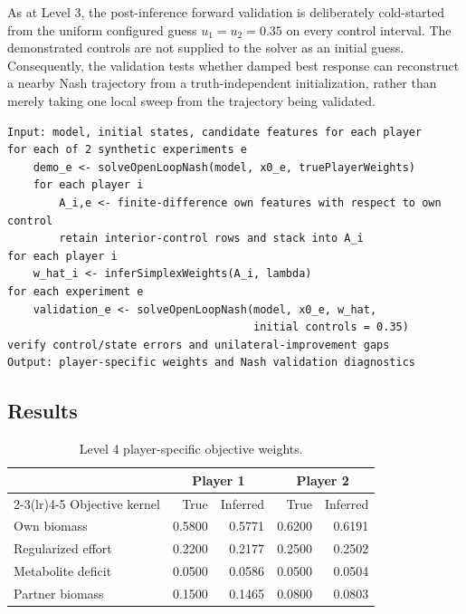 \documentclass[11pt,a4paper]{article}
\begin{document}
As at Level 3, the post-inference forward validation is deliberately
cold-started from the uniform configured guess \(u_1=u_2=0.35\) on every
control interval. The demonstrated controls are not supplied to the solver as
an initial guess. Consequently, the validation tests whether damped best
response can reconstruct a nearby Nash trajectory from a truth-independent
initialization, rather than merely taking one local sweep from the trajectory
being validated.

\noindent\begin{minipage}{\linewidth}
\begin{lstlisting}[style=pseudostyle,title={Compact MATLAB pseudocode}]
Input: model, initial states, candidate features for each player
for each of 2 synthetic experiments e
    demo_e <- solveOpenLoopNash(model, x0_e, truePlayerWeights)
    for each player i
        A_i,e <- finite-difference own features with respect to own control
        retain interior-control rows and stack into A_i
for each player i
    w_hat_i <- inferSimplexWeights(A_i, lambda)
for each experiment e
    validation_e <- solveOpenLoopNash(model, x0_e, w_hat,
                                      initial controls = 0.35)
verify control/state errors and unilateral-improvement gaps
Output: player-specific weights and Nash validation diagnostics
\end{lstlisting}
\end{minipage}

\subsection{Results}

\begin{table}[H]
\centering
\caption{Level 4 player-specific objective weights.}
\label{tab:level4}
\begin{tabular}{lrrrr}
\toprule
& \multicolumn{2}{c}{Player 1} & \multicolumn{2}{c}{Player 2}\\
\cmidrule(lr){2-3}\cmidrule(lr){4-5}
Objective kernel & True & Inferred & True & Inferred\\
\midrule
Own biomass & 0.5800 & 0.5771 & 0.6200 & 0.6191\\
Regularized effort & 0.2200 & 0.2177 & 0.2500 & 0.2502\\
Metabolite deficit & 0.0500 & 0.0586 & 0.0500 & 0.0504\\
Partner biomass & 0.1500 & 0.1465 & 0.0800 & 0.0803\\
\bottomrule
\end{tabular}
\end{table}
\end{document}
